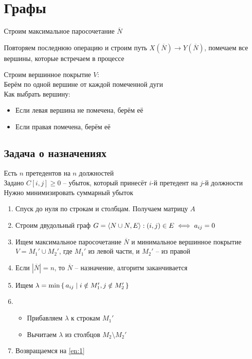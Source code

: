 \chapter{Графы}

\begin{algo}
    \item Строим максимальное паросочетание $ \overline{N} $
    \item Повторяем последнюю операцию и строим путь $ X(\overline{N}) \to Y(\overline{N}) $, помечаем все вершины, которые встречаем в процессе
    \item Строим вершинное покрытие $ V $: \\
    Берём по одной вершине от каждой помеченной дуги \\
    Как выбрать вершину:
    \begin{itemize}
        \item Если левая вершина не помечена, берём её
        \item Если правая помечена, берём её
    \end{itemize}
\end{algo}

\section{Задача о назначениях}

\begin{problem}
    Есть $ n $ претедентов на $ n $ должностей \\
    Задано $ C[i, j] \ge 0 $ -- убыток, который принесёт $ i $-й претедент на $ j $-й должности \\
    Нужно минимизировать суммарный убыток
\end{problem}

\begin{algorithm}
	\hfill
    \begin{enumerate}
        \item \label{en:1} Спуск до нуля по строкам и столбцам. Получаем матрицу $ A $
        \item Строим двудольный граф $ G = \braket{N \cup N, E} : (i, j) \in E \iff a_{ij} = 0 $
        \item Ищем максимальное паросочетание $ \overline{N} $ и минимальное вершинное покрытие $ V = M_1' \cup M_2' $, где $ M_1' $ из левой части, и $ M_2' $ -- из правой
        \item Если $ |\overline{N}| = n $, то $ \overline{N} $ -- назначение, алгоритм заканчивается
        \item Ищем $ \lambda = \min\set{a_{ij} | i \notin M_1', j \notin M_2'} $
        \item
        \begin{itemize}
        	\item Прибавляем $ \lambda $ к строкам $ M_1' $
            \item Вычитаем $ \lambda $ из столбцов $ M_2 \setminus M_2' $
        \end{itemize}
        \item Возвращаемся на \ref{en:1}
    \end{enumerate}
\end{algorithm}

